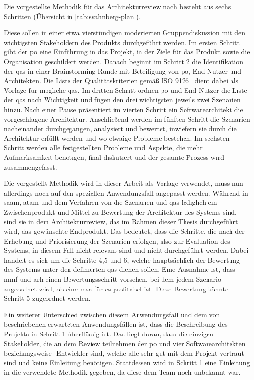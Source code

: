 Die vorgestellte Methodik für das Architekturreview nach   besteht aus sechs Schritten (Übersicht in \cref{tab:svahnberg-plan}).

Diese sollen in einer etwa vierstündigen moderierten Gruppendiskussion mit den wichtigsten Stakeholdern des Produkts durchgeführt werden.
Im ersten Schritt gibt der \gls{po} eine Einführung in das Projekt, in der Ziele für das Produkt sowie die Organisation geschildert werden.
Danach beginnt im Schritt 2 die Identifikation der \glspl{qa} in einer Brainstorming-Runde mit Beteiligung von \gls{po}, End-Nutzer und Architekten.
Die Liste der Qualitätskriterien gemäß ISO 9126~\cite{ISO-9126} dient dabei als Vorlage für mögliche \glspl{qa}.
Im dritten Schritt ordnen \gls{po} und End-Nutzer die Liste der \glspl{qa} nach Wichtigkeit und fügen den drei wichtigsten jeweils zwei Szenarien hinzu.
Nach einer Pause präsentiert im vierten Schritt ein Softwarearchitekt die vorgeschlagene Architektur.
Anschließend werden im fünften Schritt die Szenarien nacheinander durchgegangen, analysiert und bewertet, inwiefern sie durch die Architektur erfüllt werden und wo etwaige Probleme bestehen.
Im sechsten Schritt werden alle festgestellten Probleme und Aspekte, die mehr Aufmerksamkeit benötigen, final diskutiert und der gesamte Prozess wird zusammengefasst.

Die vorgestellt Methodik wird in dieser Arbeit als Vorlage verwendet, muss nun allerdings noch auf den speziellen Anwendungsfall angepasst werden.
Während in \gls{saam}, \gls{atam} und dem Verfahren von  die Szenarien und \glspl{qa} lediglich ein Zwischenprodukt und Mittel zu Bewertung der Architektur des Systems sind, sind sie in dem Architekturreview, das im Rahmen dieser Thesis durchgeführt wird, das gewünschte Endprodukt.
Das bedeutet, dass die Schritte, die nach der Erhebung und Priorisierung der Szenarien erfolgen, also zur Evaluation des Systems, in diesem Fall nicht relevant sind und nicht durchgeführt werden.
Dabei handelt es sich um die Schritte 4,5 und 6, welche hauptsächlich der Bewertung des Systems unter den definierten \glspl{qa} dienen sollen.
Eine Ausnahme ist, dass \gls{mmf} und \gls{arh} einen Bewertungsschritt vorsehen, bei dem jedem Szenario zugeordnet wird, ob eine \gls{msa} für es profitabel ist.
Diese Bewertung könnte Schritt 5 zugeordnet werden.

Ein weiterer Unterschied zwischen diesem Anwendungsfall und dem von  beschriebenen erwarteten Anwendungsfällen ist, dass die Beschreibung des Projekts in Schritt 1 überflüssig ist.
Das liegt daran, dass die einzigen Stakeholder, die an dem Review teilnehmen der \acrfull{po} und vier Softwarearchitekten beziehungsweise -Entwickler sind, welche alle sehr gut mit dem Projekt vertraut sind und keine Einleitung benötigen.
Stattdessen wird in Schritt 1 eine Einleitung in die verwendete Methodik gegeben, da diese dem Team noch unbekannt war.

